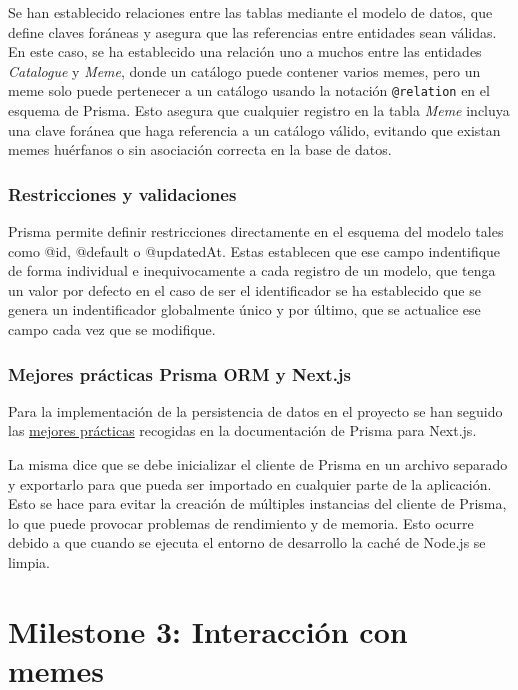 Se han establecido relaciones entre las tablas mediante el modelo de datos, que define claves foráneas y asegura que las referencias entre entidades sean válidas. En este caso, se ha establecido una relación uno a muchos entre las entidades \textit{Catalogue} y \textit{Meme}, donde un catálogo puede contener varios memes, pero un meme solo puede pertenecer a un catálogo usando la notación \texttt{@relation} en el esquema de Prisma. Esto asegura que cualquier registro en la tabla \textit{Meme} incluya una clave foránea que haga referencia a un catálogo válido, evitando que existan memes huérfanos o sin asociación correcta en la base de datos.

\subsubsection{Restricciones y validaciones}

Prisma permite definir restricciones directamente en el esquema del modelo tales como @id, @default o @updatedAt. Estas establecen que ese campo indentifique de forma individual e inequivocamente a cada registro de un modelo, que tenga un valor por defecto en el caso de ser el identificador se ha establecido que se genera un indentificador globalmente único y por último, que se actualice ese campo cada vez que se modifique.

\subsubsection{Mejores prácticas Prisma ORM y Next.js}

Para la implementación de la persistencia de datos en el proyecto se han seguido las \href{https://www.prisma.io/docs/orm/more/help-and-troubleshooting/help-articles/nextjs-prisma-client-dev-practices}{mejores prácticas} recogidas en la documentación de Prisma para Next.js.

La misma dice que se debe inicializar el cliente de Prisma en un archivo separado y exportarlo para que pueda ser importado en cualquier parte de la aplicación. Esto se hace para evitar la creación de múltiples instancias del cliente de Prisma, lo que puede provocar problemas de rendimiento y de memoria. Esto ocurre debido a que cuando se ejecuta el entorno de desarrollo la caché de Node.js se limpia.

\section{Milestone 3: Interacción con memes}

